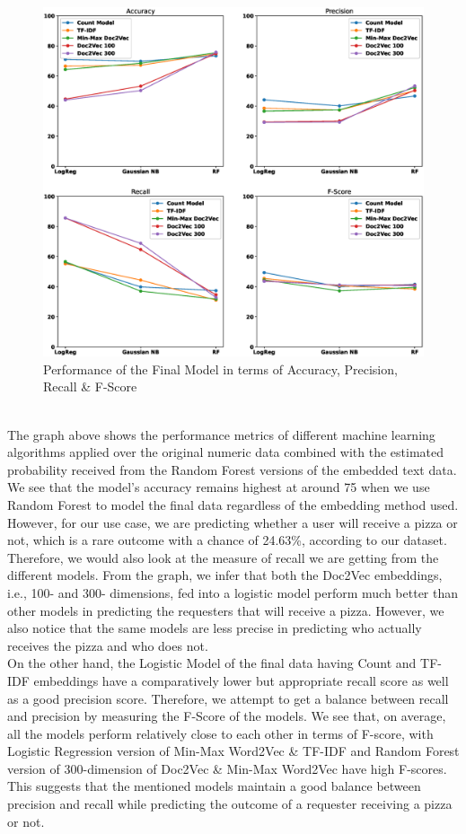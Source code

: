 \documentclass[runningheads]{llncs}
\begin{document}
\begin{figure}
\includegraphics[width=\textwidth]{Final_Model_Performance.eps}
\caption{Performance of the Final Model in terms of Accuracy, Precision, Recall \& F-Score} \label{fig3}
\end{figure}
\\ The graph above shows the performance metrics of different machine learning algorithms applied over the original numeric data combined with the estimated probability received from the Random Forest versions of the embedded text data. We see that the model’s accuracy remains highest at around 75 when we use Random Forest to model the final data regardless of the embedding method used. However, for our use case, we are predicting whether a user will receive a pizza or not, which is a rare outcome with a chance of 24.63\%, according to our dataset. Therefore, we would also look at the measure of recall we are getting from the different models. From the graph, we infer that both the Doc2Vec embeddings, i.e., 100- and 300- dimensions, fed into a logistic model perform much better than other models in predicting the requesters that will receive a pizza. However, we also notice that the same models are less precise in predicting who actually receives the pizza and who does not.\\
On the other hand, the Logistic Model of the final data having Count and TF-IDF embeddings have a comparatively lower but appropriate recall score as well as a good precision score. Therefore, we attempt to get a balance between recall and precision by measuring the F-Score of the models. We see that, on average, all the models perform relatively close to each other in terms of F-score, with Logistic Regression version of Min-Max Word2Vec \& TF-IDF and Random Forest version of 300-dimension of Doc2Vec \& Min-Max Word2Vec have high F-scores. This suggests that the mentioned models maintain a good balance between precision and recall while predicting the outcome of a requester receiving a pizza or not.\\
\end{document}
